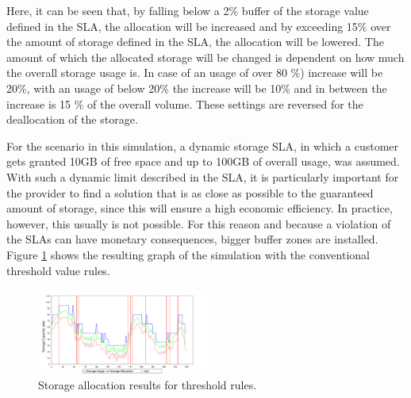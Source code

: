 %	

Here, it can be seen that, by falling below a 2\% buffer of the storage value defined in the SLA, the allocation will be increased and by exceeding 15\% over the amount of storage defined in the SLA, the allocation will be lowered. The amount of which the allocated storage will be changed is dependent on how much the overall storage usage is. In case of an usage of over 80 \%) increase will be 20\%, with an usage of below 20\% the increase will be 10\% and in between the increase is 15 \% of the overall volume. These settings are reversed for the deallocation of the storage.

For the scenario in this simulation, a dynamic storage SLA, in which a customer gets granted 10GB of free space and up to 100GB of overall usage, was assumed. With such a dynamic limit described in the SLA, it is particularly important for the provider to find a solution that is as close as possible to the guaranteed amount of storage, since this will ensure a high economic efficiency. In practice, however, this usually is not possible. For this reason and because a violation of the SLAs can have monetary consequences, bigger buffer zones are installed. Figure \ref{fig:ResultsSW} shows the resulting graph of the simulation with the conventional threshold value rules.

\begin{figure}[ht]
	\begin{center}
		\includegraphics[width=0.5\textwidth]{fig/storage-sw2.png}
	\end{center}
	\caption{Storage allocation results for threshold rules.}
	\label{fig:ResultsSW}
\end{figure}


